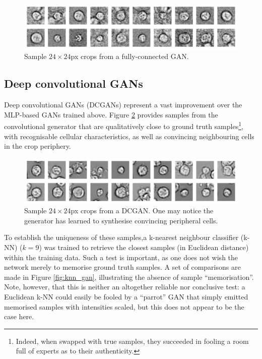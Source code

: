 \begin{figure}[h!]
\centering
\includegraphics[width=\textwidth]{img/feasibility_gan_samples.pdf}
\caption{Sample $24\times 24$px crops from a fully-connected GAN.}
\label{fig:gan_samples}
\end{figure}

\subsection{Deep convolutional GANs}

Deep convolutional GANs (DCGANs) represent a vast improvement over the MLP-based GANs trained above. Figure \ref{fig:dcgan_samples} provides samples from the convolutional generator that are qualitatively close to ground truth samples\footnote{Indeed, when swapped with true samples, they succeeded in fooling a room full of experts as to their authenticity.}, with recognisable cellular characteristics, as well as convincing neighbouring cells in the crop periphery.

\begin{figure}[h!]
\centering
\includegraphics[width=\textwidth]{img/feasibility_dcgan_samples.pdf}
\caption{Sample $24\times 24$px crops from a DCGAN. One may notice the generator has learned to synthesise convincing peripheral cells.}
\label{fig:dcgan_samples}
\end{figure}

To establish the uniqueness of these samples,a k-nearest neighbour classifier (k-NN) ($k=9$) was trained to retrieve the closest samples (in Euclidean distance) within the training data. Such a test is important, as one does not wish the network merely to memorise ground truth samples. A set of comparisons are made in Figure \ref{fig:knn_gan}, illustrating the absence of sample ``memorisation''. Note, however, that this is neither an altogether reliable nor conclusive test: a Euclidean k-NN could easily be fooled by a ``parrot'' GAN that simply emitted memorised samples with intensities scaled, but this does not appear to be the case here.


